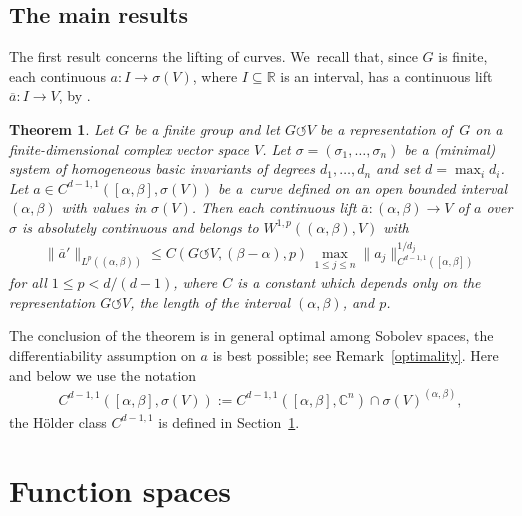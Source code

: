 \documentclass[11pt]{article}
\numberwithin{equation}{section}
\numberwithin{equation}{section}
\newtheorem{Theorem}{Theorem}[section]
\def\al{\alpha}
\def\be{\beta}
\def\si{\sigma}
\def\C{\mathbb{C}}
\def\R{\mathbb{R}}
\def\ol{\overline}
\def\acts{\circlearrowleft}
\begin{document}
\setcounter{subsection}{1}
\subsection{The main results}


The first result concerns the lifting of curves. We~recall that, since $G$ is finite, each continuous $a \colon I \to \si(V)$, where $I\subseteq \R$ is an interval,
has a continuous lift $\ol a \colon I \to V$, by \cite[Theorem 5.1]{LMRac}.



\begin{Theorem}\label{main}
 Let $G$ be a finite group and let $G \acts V$ be a representation of~$G$ on a finite-dimensional
 complex vector space $V$. Let $\si=(\si_1,\dots,\si_n)$ be a (minimal) system of homogeneous
 basic invariants of degrees $d_1,\dots,d_n$ and set $d = \max_i d_i$.
 Let $a \in C^{d-1,1}([\al,\be],\si(V))$ be a~curve
 defined on an open bounded interval
 $(\al,\be)$ with values in $\si(V)$.
 Then each continuous lift $\overline a \colon (\al,\be) \to V$ of $a$ over $\si$ is absolutely continuous and
 belongs to $W^{1,p}((\al,\be),V)$
 with
 \begin{gather} \label{eq:main}
 	 \|\ol a'\|_{L^p((\al,\be))} \le
 C(G \acts V,(\be-\al),p)\, \max_{1 \le j \le n} \|a_j\|^{1/d_j}_{C^{d-1,1}([\al, \be])}		
 	\end{gather}	
 for all $1 \le p < d/(d-1)$,
 where $C$ is a constant which depends only on the representation $G \acts V$, the length of the interval $(\al,\be)$, and $p$.	
\end{Theorem}

{\samepage
The conclusion of the theorem is in general optimal among Sobolev spaces, the differentiability assumption on $a$ is best possible;
see Remark~\ref{optimality}.
Here and below we use the notation
\begin{gather*}
 C^{d-1,1}([\al,\be],\si(V)) := C^{d-1,1}([\al,\be],\C^n) \cap \si(V)^{(\al,\be)},
\end{gather*}
the H\"older class $C^{d-1,1}$ is defined in Section~\ref{functionspaces}.

}


\section{Function spaces}\label{functionspaces}
\end{document}
